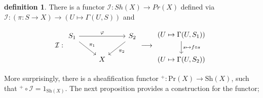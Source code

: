 \documentclass[10.5pt]{article}
\theoremstyle{definition}
\newtheorem{definition}{definition}
\begin{document}
    \begin{definition}
        There is a functor \(\mathcal{I}: Sh(X) \to Pr(X)\) defined via \(\mathcal{I}: (\pi:S\to X) \to (U \mapsto \Gamma(U,S))\) and 
    \end{definition}
    \begin{equation*}
            \mathcal{I}: \begin{tikzcd}
                S_1 \arrow[rd,"{\pi_1}"] \arrow[rr,"{\varphi}"] &&S_2 \arrow[ld,"{\pi_2}"] \\
                &X
            \end{tikzcd} \longrightarrow \begin{tikzcd}
                (U \mapsto \Gamma(U,S_1))\arrow[d,"{s \mapsto f\circ s}"] \\
                (U \mapsto \Gamma(U,S_2))
            \end{tikzcd}
    \end{equation*}

    More surprisingly, there is a sheafification functor \(^+: \text{Pr}(X) \to \text{Sh}(X)\), such that \(^+\circ \mathcal{I} = 1_{\text{Sh}(X)}\). The next proposition provides a construction for the functor;
\end{document}
